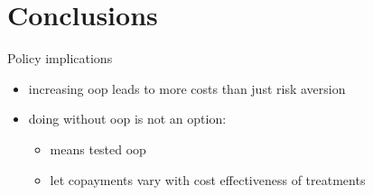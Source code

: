 \documentclass[presentation]{beamer}
\begin{document}
\section*{Conclusions}
\label{sec:org4370ebf}

\begin{frame}[label={sec:org2be6a36}]{Policy implications}
\begin{itemize}
\item increasing oop leads to more costs than just risk aversion
\item doing without oop is not an option:
\begin{itemize}
\item means tested oop
\item let copayments vary with cost effectiveness of treatments
\end{itemize}
\end{itemize}
\end{frame}
\end{document}
